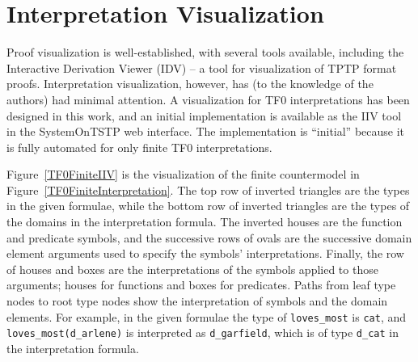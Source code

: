 \documentclass[letterpaper]{article}
\newcommand{\smalltt}[1]{\small \texttt{#1}}
\begin{document}
\section{Interpretation Visualization}
\label{Visualization}

Proof visualization is well-established, with several tools available, including the Interactive 
Derivation Viewer \cite{TPS07} (IDV) -- a tool for visualization of TPTP format proofs.
Interpretation visualization, however, has (to the knowledge of the authors) had minimal 
attention.
% 
A visualization for TF0 interpretations has been designed in this work, and an initial
implementation is available as the IIV tool in the SystemOnTSTP web interface.
The implementation is ``initial'' because it is fully automated for only finite TF0
interpretations.

Figure~\ref{TF0FiniteIIV} is the visualization of the finite countermodel in 
Figure~\ref{TF0FiniteInterpretation}.
The top row of inverted triangles are the types in the given formulae,
while the bottom row of inverted triangles are the types of the domains in the interpretation
formula.
The inverted houses are the function and predicate symbols, and the successive rows of ovals are 
the successive domain element arguments used to specify the symbols' interpretations.
Finally, the row of houses and boxes are the interpretations of the symbols applied to those
arguments; houses for functions and boxes for predicates.
Paths from leaf type nodes to root type nodes show the interpretation of symbols and the domain
elements.
For example, in the given formulae the type of {\smalltt{loves\_most}} is {\smalltt{cat}},
and {\smalltt{loves\_most(d\_arlene)}} is interpreted as {\smalltt{d\_garfield}}, which is of type
{\smalltt{d\_cat}} in the interpretation formula.
\end{document}
